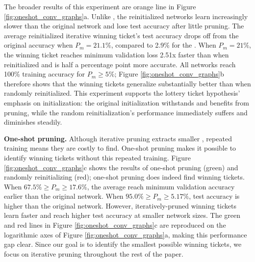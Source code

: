 The broader results of this experiment
are orange line
in Figure \ref{fig:oneshot_conv_graphs}a.
Unlike {}, the reinitialized networks learn increasingly slower than the original network and lose test accuracy after little pruning. 
The average
reinitialized iterative winning ticket's test accuracy drops off from the original accuracy when $P_m = 21.1\%$, compared to
2.9\% for the {}. When $P_m = 21\%$, the winning ticket reaches minimum validation loss
2.51x faster than when reinitialized and is half a percentage point more accurate. All networks reach 100\% training
accuracy for $P_m \geq 5\%$; Figure \ref{fig:oneshot_conv_graphs}b therefore shows that the winning tickets generalize substantially better than when randomly reinitialized.
This experiment supports the lottery ticket hypothesis' emphasis
on initialization: the original initialization withstands and benefits from pruning, while
the random reinitialization's performance immediately suffers and diminishes steadily.

\textbf{One-shot pruning.}
Although iterative pruning extracts smaller {}, repeated training means they are costly
to find.
One-shot pruning makes it possible to identify winning tickets without this repeated training.
Figure \ref{fig:oneshot_conv_graphs}c shows the results of one-shot pruning (green) and randomly reinitializing (red); one-shot pruning does indeed find winning tickets.
When $67.5\% \geq P_m \geq 17.6\%$, the average {}
reach minimum validation accuracy earlier than the original network. When $95.0\% \geq P_m \geq 5.17\%$, test accuracy is higher than the original network.
However, iteratively-pruned winning tickets learn faster and reach higher
test accuracy at smaller network sizes.
The green and red lines in Figure \ref{fig:oneshot_conv_graphs}c are reproduced on the logarithmic axes of Figure \ref{fig:oneshot_conv_graphs}a,
making this performance gap clear.
Since our goal is to identify the smallest possible winning tickets, we focus on iterative pruning throughout the rest of the paper.

